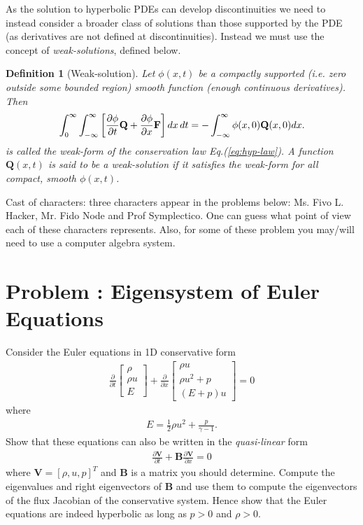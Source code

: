 \documentclass[11pt]{article}
\newtheorem{definition}{Definition}
\newcommand{\eqr}[1]{Eq.\thinspace(#1)}
\newcommand{\pfrac}[2]{\frac{\partial #1}{\partial #2}}
\newcommand{\mvec}[1]{\mathbf{#1}}
\newcounter{probnum}
\begin{document}
As the solution to hyperbolic PDEs can develop discontinuities we need
to instead consider a broader class of solutions than those supported
by the PDE (as derivatives are not defined at
discontinuities). Instead we must use the concept of
\emph{weak-solutions}, defined below.

\begin{definition}[Weak-solution]
  Let $\phi(x,t)$ be a compactly supported (i.e. zero outside some
  bounded region) smooth function (enough continuous
  derivatives). Then
  \begin{align}
    \int_0^\infty  \int_{-\infty}^\infty 
    \bigg[\pfrac{\phi}{t} \mvec{Q} + \pfrac{\phi}{x} \mvec{F}\bigg]\thinspace
    dx\thinspace dt
    =
    -
    \int_{-\infty}^\infty \phi(x,0) \mvec{Q}(x,0) dx.
    \label{eq:weak-sol}
  \end{align}
  is called the \emph{weak-form} of the conservation law
  \eqr{\ref{eq:hyp-law}}. A function $\mvec{Q}(x,t)$ is said to be a
  weak-solution if it satisfies the weak-form for all compact, smooth
  $\phi(x,t)$.
\end{definition}

Cast of characters: three characters appear in the problems below:
Ms. Fivo L.  Hacker, Mr. Fido Node and Prof Symplectico. One can guess
what point of view each of these characters represents. Also, for some
of these problem you may/will need to use a computer algebra system.

\section*{Problem : Eigensystem of Euler Equations}

Consider the Euler equations in 1D conservative form
\begin{align*}
  \frac{\partial}{\partial{t}}
  \left[
    \begin{matrix}
      \rho \\
      \rho u \\
      E
    \end{matrix}
  \right]
  +
  \frac{\partial}{\partial{x}}
  \left[
    \begin{matrix}
      \rho u \\
      \rho u^2 + p \\
      (E+p)u
    \end{matrix}
  \right]
  =
  0
\end{align*}
where
\begin{align*}
  E = \frac{1}{2}\rho u^2 + \frac{p}{\gamma-1}.
\end{align*}
Show that these equations can also be written in the
\emph{quasi-linear} form
\begin{align*}
  \pfrac{\mvec{V}}{t} + \mvec{B}\pfrac{\mvec{V}}{x} = 0
\end{align*}
where $\mvec{V} = [\rho, u, p]^T$ and $\mvec{B}$ is a matrix you
should determine. Compute the eigenvalues and right eigenvectors of
$\mvec{B}$ and use them to compute the eigenvectors of the flux
Jacobian of the conservative system. Hence show that the Euler
equations are indeed hyperbolic as long as $p>0$ and $\rho > 0$.
\end{document}
